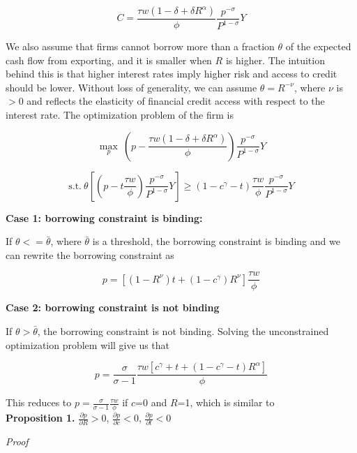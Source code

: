 \begin{equation}
C=\frac{\tau w(1-\delta+\delta R^\alpha)}{\phi} \frac{p^{-\sigma}}{P^{1-\sigma}} Y
\end{equation}

We also assume that firms cannot borrow more than a fraction $\theta$ of the expected cash flow from exporting, and it is smaller when $R$ is higher. The intuition behind this is that higher interest rates imply higher risk and access to credit should be lower. Without loss of generality, we can assume $\theta=R^{-\nu}$, where $\nu$ is $>0$ and reflects the elasticity of financial credit access with respect to the interest rate. The optimization problem of the firm is 

$$
\max_{p} \ (p- \frac{\tau w(1-\delta+\delta R^\alpha)}{\phi}) \frac{p^{-\sigma}}{P^{1-\sigma}} Y
$$

\begin{equation}
\text{s.t.} \ \theta [(p-t \frac{\tau w}{\phi}) \frac{p^{-\sigma}}{P^{1-\sigma}} Y]\geq(1-c^\gamma-t)\frac{\tau w}{\phi} \frac{p^{-\sigma}}{P^{1-\sigma}} Y
\end{equation}


\textbf{Case 1: borrowing constraint is binding: }

If $\theta<=\bar{\theta}$, where $\bar{\theta}$ is a threshold, the borrowing constraint is binding and we can rewrite the borrowing constraint as 

\begin{equation}
p=[(1-R^{\nu})t+(1-c^\gamma)R^{\nu}] \frac{\tau w}{\phi}
\end{equation}

\textbf{Case 2: borrowing constraint is not binding}

If $\theta>\bar{\theta}$, the borrowing constraint is not binding. Solving the unconstrained optimization problem will give us that

\begin{equation}
p=\frac{\sigma}{\sigma-1}\frac{\tau w [c^\gamma+t+(1-c^\gamma-t) R^\alpha]}{\phi}
\end{equation}

This reduces to $p=\frac{\sigma}{\sigma-1}\frac{\tau w}{\phi}$ if $c$=0 and $R$=1, which is similar to \cite{melitz2003impact} \\


\textbf{Proposition 1.} $\frac{\partial p}{\partial R}>0$, $\frac{\partial p}{\partial c}<0$, $\frac{\partial p}{\partial t}<0$

\textit{Proof }

